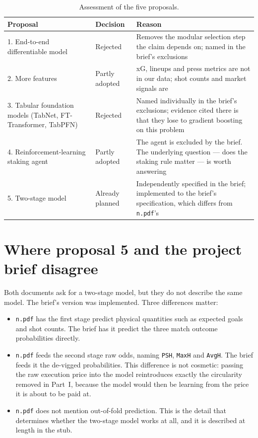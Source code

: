 \documentclass[11pt,a4paper]{article}
\newcommand{\code}[1]{\texttt{#1}}
\begin{document}
\begin{table}[h]
\centering
\small
\begin{tabular}{@{}p{5.0cm}p{2.4cm}p{7.0cm}@{}}
\toprule
\textbf{Proposal} & \textbf{Decision} & \textbf{Reason} \\
\midrule
1. End-to-end differentiable model & Rejected
  & Removes the modular selection step the claim depends on; named in the
    brief's exclusions \\[4pt]
2. More features & Partly adopted
  & xG, lineups and press metrics are not in our data; shot counts and market
    signals are \\[4pt]
3. Tabular foundation models (TabNet, FT-Transformer, TabPFN) & Rejected
  & Named individually in the brief's exclusions; evidence cited there is that
    they lose to gradient boosting on this problem \\[4pt]
4. Reinforcement-learning staking agent & Partly adopted
  & The agent is excluded by the brief. The underlying question --- does the
    staking rule matter --- is worth answering \\[4pt]
5. Two-stage model & Already planned
  & Independently specified in the brief; implemented to the brief's
    specification, which differs from \code{n.pdf}'s \\
\bottomrule
\end{tabular}
\caption{Assessment of the five proposals.}
\end{table}

\section{Where proposal 5 and the project brief disagree}

Both documents ask for a two-stage model, but they do not describe the same
model. The brief's version was implemented. Three differences matter:

\begin{itemize}
  \item \code{n.pdf} has the first stage predict physical quantities such as
        expected goals and shot counts. The brief has it predict the three
        match outcome probabilities directly.
  \item \code{n.pdf} feeds the second stage raw odds, naming
        \code{PSH}, \code{MaxH} and \code{AvgH}. The brief feeds it the
        de-vigged probabilities. This difference is not cosmetic: passing the
        raw execution price into the model reintroduces exactly the
        circularity removed in Part~I, because the model would then be
        learning from the price it is about to be paid at.
  \item \code{n.pdf} does not mention out-of-fold prediction. This is the
        detail that determines whether the two-stage model works at all, and
        it is described at length in the stub.
\end{itemize}
\end{document}
